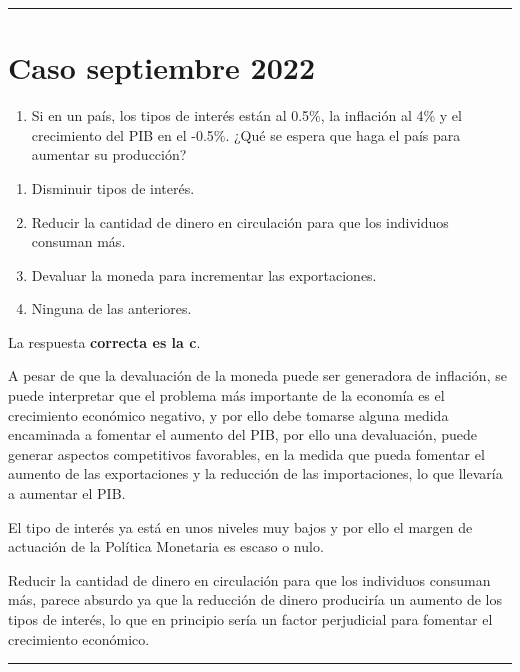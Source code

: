 \documentclass[
  letterpaper,
  DIV=11,
  numbers=noendperiod]{scrreprt}
\providecommand{\tightlist}{%
  \setlength{\itemsep}{0pt}\setlength{\parskip}{0pt}}\usepackage{longtable,booktabs,array}
\begin{document}
\begin{center}\rule{0.5\linewidth}{0.5pt}\end{center}

\hypertarget{caso-septiembre-2022}{%
\chapter*{Caso septiembre 2022}\label{caso-septiembre-2022}}


\begin{enumerate}
\def\labelenumi{\arabic{enumi}.}
\tightlist
\item
  Si en un país, los tipos de interés están al 0.5\%, la inflación al
  4\% y el crecimiento del PIB en el -0.5\%. ¿Qué se espera que haga el
  país para aumentar su producción?
\end{enumerate}

\begin{enumerate}
\def\labelenumi{\alph{enumi})}
\item
  Disminuir tipos de interés.
\item
  Reducir la cantidad de dinero en circulación para que los individuos
  consuman más.
\item
  Devaluar la moneda para incrementar las exportaciones.
\item
  Ninguna de las anteriores.
\end{enumerate}

\begin{tcolorbox}[enhanced jigsaw, left=2mm, opacityback=0, colback=white, breakable, arc=.35mm, bottomrule=.15mm, rightrule=.15mm, toprule=.15mm, leftrule=.75mm, colframe=quarto-callout-tip-color-frame]
\begin{minipage}[t]{5.5mm}
\textcolor{quarto-callout-tip-color}{\faLightbulb}
\end{minipage}%
\begin{minipage}[t]{\textwidth - 5.5mm}

La respuesta \textbf{correcta es la c}.

A pesar de que la devaluación de la moneda puede ser generadora de
inflación, se puede interpretar que el problema más importante de la
economía es el crecimiento económico negativo, y por ello debe tomarse
alguna medida encaminada a fomentar el aumento del PIB, por ello una
devaluación, puede generar aspectos competitivos favorables, en la
medida que pueda fomentar el aumento de las exportaciones y la reducción
de las importaciones, lo que llevaría a aumentar el PIB.

El tipo de interés ya está en unos niveles muy bajos y por ello el
margen de actuación de la Política Monetaria es escaso o nulo.

Reducir la cantidad de dinero en circulación para que los individuos
consuman más, parece absurdo ya que la reducción de dinero produciría un
aumento de los tipos de interés, lo que en principio sería un factor
perjudicial para fomentar el crecimiento económico.

\end{minipage}%
\end{tcolorbox}

\begin{center}\rule{0.5\linewidth}{0.5pt}\end{center}
\end{document}
